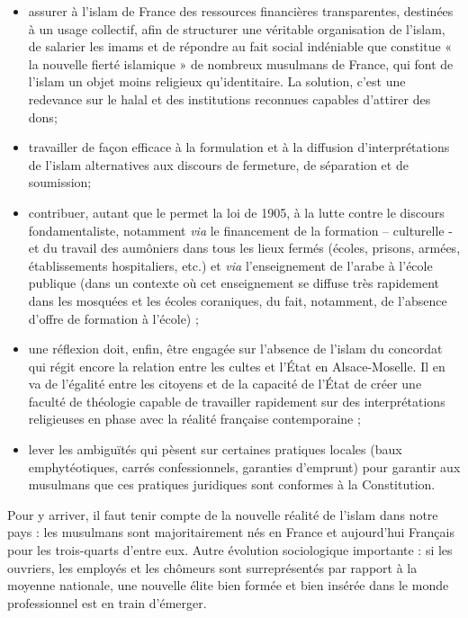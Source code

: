 \begin{itemize}
\item
  assurer à l'islam de France des ressources financières transparentes,
  destinées à un usage collectif, afin de structurer une véritable
  organisation de l'islam, de salarier les imams et de répondre au fait
  social indéniable que constitue « la nouvelle fierté islamique » de
  nombreux musulmans de France, qui font de l'islam un objet moins
  religieux qu'identitaire. La solution, c'est une redevance sur le
  halal et des institutions reconnues capables d'attirer des dons;
\item
  travailler de façon efficace à la formulation et à la diffusion
  d'interprétations de l'islam alternatives aux discours de fermeture,
  de séparation et de soumission;
\item
  contribuer, autant que le permet la loi de 1905, à la lutte contre le
  discours fondamentaliste, notamment \emph{via} le financement de la
  formation -- culturelle - et du travail des aumôniers dans tous les
  lieux fermés (écoles, prisons, armées, établissements hospitaliers,
  etc.) et \emph{via} l'enseignement de l'arabe à l'école publique (dans
  un contexte où cet enseignement se diffuse très rapidement dans les
  mosquées et les écoles coraniques, du fait, notamment, de l'absence
  d'offre de formation à l'école) ;
\item
  une réflexion doit, enfin, être engagée sur l'absence de l'islam du
  concordat qui régit encore la relation entre les cultes et l'État en
  Alsace-Moselle. Il en va de l'égalité entre les citoyens et de la
  capacité de l'État de créer une faculté de théologie capable de
  travailler rapidement sur des interprétations religieuses en phase
  avec la réalité française contemporaine ;
\item
  lever les ambiguïtés qui pèsent sur certaines pratiques locales (baux
  emphytéotiques, carrés confessionnels, garanties d'emprunt) pour
  garantir aux musulmans que ces pratiques juridiques sont conformes à
  la Constitution.
\end{itemize}


Pour y arriver, il faut tenir compte de la nouvelle réalité de l'islam
dans notre pays : les musulmans sont majoritairement nés en France et
aujourd'hui Français pour les trois-quarts d'entre eux. Autre évolution
sociologique importante : si les ouvriers, les employés et les chômeurs
sont surreprésentés par rapport à la moyenne nationale, une nouvelle
élite bien formée et bien insérée dans le monde professionnel est en
train d'émerger.


